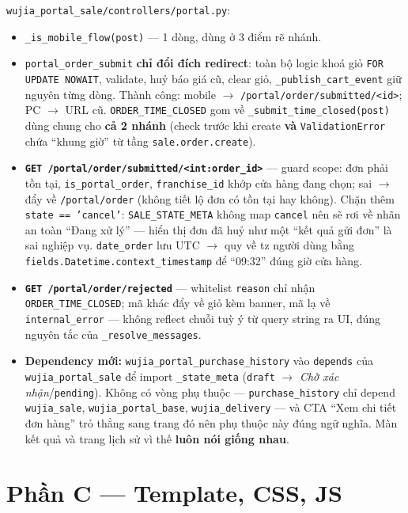 \texttt{wujia\_portal\_sale/controllers/portal.py}:

\begin{itemize}
  \item \texttt{\_is\_mobile\_flow(post)} --- 1 dòng, dùng ở 3 điểm rẽ nhánh.
  \item \texttt{portal\_order\_submit} \textbf{chỉ đổi đích redirect}: toàn bộ logic khoá giỏ
    \texttt{FOR UPDATE NOWAIT}, validate, huỷ báo giá cũ, clear giỏ, \texttt{\_publish\_cart\_event}
    giữ nguyên từng dòng. Thành công: mobile $\to$ \texttt{/portal/order/submitted/<id>};
    PC $\to$ URL cũ. \texttt{ORDER\_TIME\_CLOSED} gom về \texttt{\_submit\_time\_closed(post)}
    dùng chung cho \textbf{cả 2 nhánh} (check trước khi create \textbf{và}
    \texttt{ValidationError} chứa ``khung giờ'' từ tầng \texttt{sale.order.create}).
  \item \textbf{\texttt{GET /portal/order/submitted/<int:order\_id>}} --- guard scope: đơn phải tồn
    tại, \texttt{is\_portal\_order}, \texttt{franchise\_id} khớp cửa hàng đang chọn; sai $\to$ đẩy về
    \texttt{/portal/order} (không tiết lộ đơn có tồn tại hay không). Chặn thêm
    \texttt{state == 'cancel'}: \texttt{SALE\_STATE\_META} không map \texttt{cancel} nên sẽ rơi về
    nhãn an toàn ``Đang xử lý'' --- hiển thị đơn đã huỷ như một ``kết quả gửi đơn'' là sai nghiệp vụ.
    \texttt{date\_order} lưu UTC $\to$ quy về tz người dùng bằng
    \texttt{fields.Datetime.context\_timestamp} để ``09:32'' đúng giờ cửa hàng.
  \item \textbf{\texttt{GET /portal/order/rejected}} --- whitelist \texttt{reason} chỉ nhận
    \texttt{ORDER\_TIME\_CLOSED}; mã khác đẩy về giỏ kèm banner, mã lạ về
    \texttt{internal\_error} --- không reflect chuỗi tuỳ ý từ query string ra UI, đúng nguyên tắc
    của \texttt{\_resolve\_messages}.
  \item \textbf{Dependency mới:} \texttt{wujia\_portal\_purchase\_history} vào \texttt{depends} của
    \texttt{wujia\_portal\_sale} để import \texttt{\_state\_meta}
    (\texttt{draft} $\to$ \emph{Chờ xác nhận}/\texttt{pending}). Không có vòng phụ thuộc ---
    \texttt{purchase\_history} chỉ depend \texttt{wujia\_sale}, \texttt{wujia\_portal\_base},
    \texttt{wujia\_delivery} --- và CTA ``Xem chi tiết đơn hàng'' trỏ thẳng sang trang đó nên phụ
    thuộc này đúng ngữ nghĩa. Màn kết quả và trang lịch sử vì thế \textbf{luôn nói giống nhau}.
\end{itemize}

\section{Phần C --- Template, CSS, JS}

